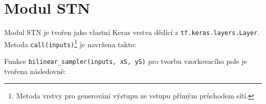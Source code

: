 \section{Modul STN}
\label{sec:Chapter56}
Modul STN je tvořen jako vlastní Keras vrstva dědící z \texttt{tf.keras.layers.Layer}. Metoda \texttt{call(inputs)}\footnote{Metoda vrstvy pro generování výstupu ze vstupu přímým průchodem sítí.} je navržena takto:

\label{src:stn_call}


Funkce \texttt{bilinear\_sampler(inputs, xS, yS)} pro tvorbu vzorkovacího pole je tvořena následovně:

\label{src:stn_grid_gen}


\endinput